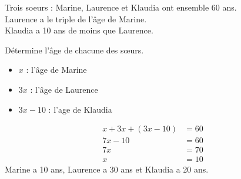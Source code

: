 \documentclass[a4paper,fontsize=12pt, parskip=half]{scrartcl}
\begin{document}
\begin{exercise}
    Trois soeurs : Marine, Laurence et Klaudia ont ensemble 60 ans.\\
    Laurence a le triple de l'âge de Marine.\\
    Klaudia a 10 ans de moins que Laurence.\par
    Détermine l'âge de chacune des s{\oe}urs.
\end{exercise}
\begin{solution}
    \begin{itemize}[label=\faAngleRight]
        \item $x$ : l'âge de Marine
        \item $3x$ : l'âge de Laurence
        \item $3x-10$ : l'age de Klaudia
    \end{itemize}
    \begin{align*}
        x + 3x + (3x-10) & = 60 \\
        7x - 10          & = 60 \\
        7x               & = 70 \\
        x                & = 10
    \end{align*}
    Marine a 10 ans, Laurence a 30 ans et Klaudia a 20 ans.
\end{solution}
\end{document}
